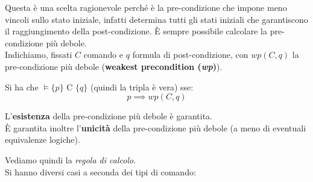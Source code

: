 				      				Questa è una scelta ragionevole perché è la pre-condizione che impone meno
				      				vincoli sullo stato iniziale, infatti determina tutti gli stati iniziali che
				      				garantiscono il raggiungimento della post-condizione. È sempre possibile
				      				calcolare la pre-condizione più debole.\\
				      				Indichiamo, fissati $C$ comando e $q$ formula di post-condizione, con $wp(C, q)$
				      				la pre-condizione più debole (\textbf{weakest precondition (\textit{wp})}).
				      				\begin{teorema}
				      					Si ha che $\vDash\{p\}\mbox{ C }\{q\}$ (quindi la tripla è vera) sse:
				      					\[p\implies wp(C, q)\]
				      				\end{teorema}
				      				\begin{teorema}
				      					L'\textbf{esistenza} della pre-condizione più debole è garantita.\\
				      					È garantita inoltre l'\textbf{unicità} della pre-condizione più debole (a meno
				      					di eventuali equivalenze logiche).
				      				\end{teorema}
				      				Vediamo quindi la \textit{regola di calcolo}.\\
				      				Si hanno diversi casi a seconda dei tipi di comando:
